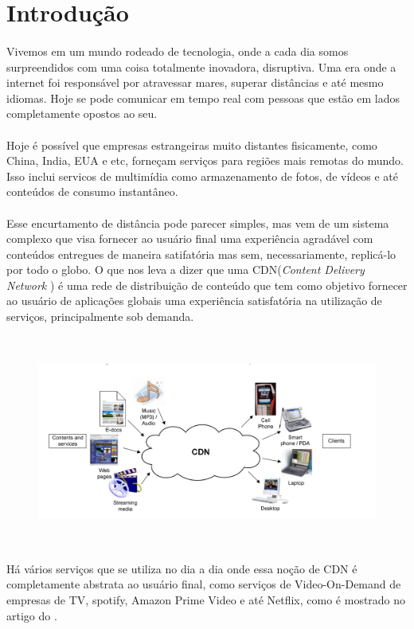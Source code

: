 \section{Introdu\c{c}\~ao}

\paragraph{}
Vivemos em um mundo rodeado de tecnologia, onde a cada dia somos surpreendidos com uma coisa totalmente inovadora, disruptiva. Uma era onde a internet foi respons\'avel por atravessar mares, superar dist\^ancias e at\'e mesmo idiomas. Hoje se pode comunicar em tempo real com pessoas que est\~ao em lados completamente opostos ao seu. 
\paragraph{}
Hoje \'e poss\'ivel que empresas estrangeiras muito distantes fisicamente, como China, India, EUA e etc, forne\c{c}am servi\c{c}os para regi\~oes mais remotas do mundo. Isso inclui servi{c}os de multim\'idia como armazenamento de fotos, de v\'ideos e at\'e conte\'udos de consumo instant\^aneo.
\paragraph{}
Esse encurtamento de dist\^ancia pode parecer simples, mas vem de um sistema complexo que visa fornecer ao usu\'ario final uma experi\^encia agrad\'avel com conte\'udos entregues de maneira satifat\'oria mas sem, necessariamente, replic\'a-lo por todo o globo. O que nos leva a dizer que uma CDN(\textit{Content Delivery Network} ) \'e uma rede de distribui\c{c}\~ao de conte\'udo que tem como objetivo fornecer ao usu\'ario de aplica\c{c}\~oes globais uma experi\^encia satisfat\'oria na utiliza\c{c}\~ao de servi\c{c}os, principalmente sob demanda.
\begin{figure}[H]
\includegraphics[height=7cm]{Figuras/contextualizacao.png} 
\label{figura:contextualizacao} 
\end{figure}
H\'a v\'arios servi\c{c}os que se utiliza no dia a dia onde essa no\c{c}\~ao de CDN \'e completamente abstrata ao usu\'ario final, como servi\c{c}os de Video-On-Demand de empresas de TV, spotify, Amazon Prime Video e at\'e Netflix, como \'e mostrado no artigo do \cite{adhikari2012unreeling}.
